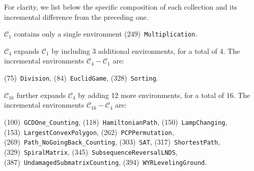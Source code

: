 \documentclass{article}
\theoremstyle{plain}
\theoremstyle{definition}
\theoremstyle{remark}
\begin{document}
For clarity, we list below the specific composition of each collection and its incremental difference from the preceding one.

$\mathcal{C}_1$ contains only a single environment (249)~\texttt{Multiplication}.

$\mathcal{C}_4$ expands $\mathcal{C}_1$ by including 3 additional environments, for a total of 4. The incremental environments $\mathcal{C}_4-\mathcal{C}_1$ are:
\begin{flushleft}
(75)~\texttt{Division},
(84)~\texttt{EuclidGame},
(328)~\texttt{Sorting}.
\end{flushleft}

$\mathcal{C}_{16}$ further expands $\mathcal{C}_4$ by adding 12 more environments, for a total of 16. The incremental environments $\mathcal{C}_{16}-\mathcal{C}_4$ are:
\begin{flushleft}
(100)~\texttt{GCDOne\_Counting},
(118)~\texttt{HamiltonianPath},
(150)~\texttt{LampChanging},
(153)~\texttt{LargestConvexPolygon},
(262)~\texttt{PCPPermutation},
(269)~\texttt{Path\_NoGoingBack\_Counting},
(303)~\texttt{SAT},
(317)~\texttt{ShortestPath},
(329)~\texttt{SpiralMatrix},
(345)~\texttt{SubsequenceReversalLNDS},
(387)~\texttt{UndamagedSubmatrixCounting},
(394)~\texttt{WYRLevelingGround}.
\end{flushleft}
\end{document}
